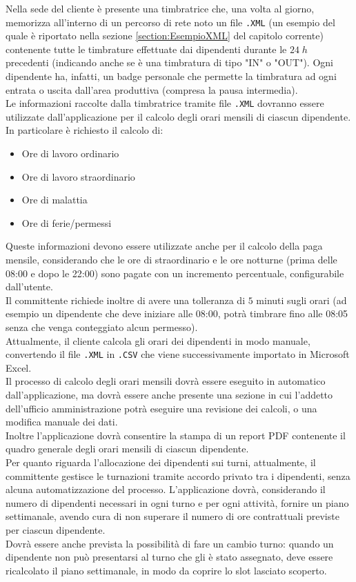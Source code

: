 \noindent
Nella sede del cliente è presente una timbratrice che, una volta al giorno, memorizza all'interno di un percorso di rete noto un file \verb|.XML| (un esempio del quale è riportato nella sezione \ref{section:EsempioXML} del capitolo corrente) contenente tutte le timbrature effettuate dai dipendenti durante le $24\;h$ precedenti (indicando anche se è una timbratura di tipo "IN" o "OUT"). Ogni dipendente ha, infatti, un badge personale che permette la timbratura ad ogni entrata o uscita dall'area produttiva (compresa la pausa intermedia).\\
Le informazioni raccolte dalla timbratrice tramite file \verb|.XML| dovranno essere utilizzate dall'applicazione per il calcolo degli orari mensili di ciascun dipendente. In particolare è richiesto il calcolo di:
\begin{itemize}
	\item Ore di lavoro ordinario
	\item Ore di lavoro straordinario
	\item Ore di malattia
	\item Ore di ferie/permessi
\end{itemize}
Queste informazioni devono essere utilizzate anche per il calcolo della paga mensile, considerando che le ore di straordinario e le ore notturne (prima delle 08:00 e dopo le 22:00) sono pagate con un incremento percentuale, configurabile dall'utente.\\
Il committente richiede inoltre di avere una tolleranza di $5$ minuti sugli orari (ad esempio un dipendente che deve iniziare alle 08:00, potrà timbrare fino alle 08:05 senza che venga conteggiato alcun permesso).\\

\noindent
Attualmente, il cliente calcola gli orari dei dipendenti in modo manuale, convertendo il file \verb|.XML| in \verb|.CSV| che viene successivamente importato in Microsoft Excel\textsuperscript\textregistered.\\
Il processo di calcolo degli orari mensili dovrà essere eseguito in automatico dall'applicazione, ma dovrà essere anche presente una  sezione in cui l'addetto dell'ufficio amministrazione potrà eseguire una revisione dei calcoli, o una modifica manuale dei dati.\\
Inoltre l'applicazione dovrà consentire la stampa di un report PDF contenente il quadro generale degli orari mensili di ciascun dipendente.\\

\noindent
Per quanto riguarda l'allocazione dei dipendenti sui turni, attualmente, il committente gestisce le turnazioni tramite accordo privato tra i dipendenti, senza alcuna automatizzazione del processo. L'applicazione dovrà, considerando il numero di dipendenti necessari in ogni turno e per ogni attività, fornire un piano settimanale, avendo cura di non superare il numero di ore contrattuali previste per ciascun dipendente.\\
Dovrà essere anche prevista la possibilità di fare un cambio turno: quando un dipendente non può presentarsi al turno che gli è stato assegnato, deve essere ricalcolato il piano settimanale, in modo da coprire lo slot lasciato scoperto.\\

